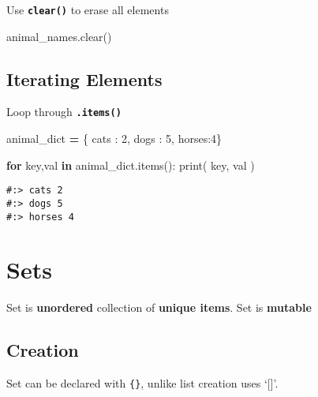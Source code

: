 \documentclass[
]{book}
\newenvironment{Shaded}{\begin{snugshade}}{\end{snugshade}}
\newcommand{\BuiltInTok}[1]{#1}
\newcommand{\ControlFlowTok}[1]{\textcolor[rgb]{0.27,0.27,0.27}{\textbf{#1}}}
\newcommand{\DecValTok}[1]{\textcolor[rgb]{0.06,0.06,0.06}{#1}}
\newcommand{\KeywordTok}[1]{\textcolor[rgb]{0.27,0.27,0.27}{\textbf{#1}}}
\newcommand{\NormalTok}[1]{#1}
\newcommand{\OperatorTok}[1]{\textcolor[rgb]{0.43,0.43,0.43}{\textbf{#1}}}
\newcommand{\StringTok}[1]{\textcolor[rgb]{0.5,0.5,0.5}{#1}}
\begin{document}
Use \textbf{\texttt{clear()}} to erase all elements

\begin{Shaded}
\begin{Highlighting}[]
\NormalTok{animal\_names.clear()}
\end{Highlighting}
\end{Shaded}

\hypertarget{iterating-elements}{%
\subsection{Iterating Elements}\label{iterating-elements}}

Loop through \textbf{\texttt{.items()}}

\begin{Shaded}
\begin{Highlighting}[]
\NormalTok{animal\_dict }\OperatorTok{=}\NormalTok{ \{ }\StringTok{\textquotesingle{}cats\textquotesingle{}}\NormalTok{ : }\DecValTok{2}\NormalTok{, }\StringTok{\textquotesingle{}dogs\textquotesingle{}}\NormalTok{ : }\DecValTok{5}\NormalTok{, }\StringTok{\textquotesingle{}horses\textquotesingle{}}\NormalTok{:}\DecValTok{4}\NormalTok{\}}

\ControlFlowTok{for}\NormalTok{ key,val }\KeywordTok{in}\NormalTok{ animal\_dict.items():}
  \BuiltInTok{print}\NormalTok{( key, val )}
\end{Highlighting}
\end{Shaded}

\begin{verbatim}
#:> cats 2
#:> dogs 5
#:> horses 4
\end{verbatim}

\hypertarget{sets}{%
\section{Sets}\label{sets}}

Set is \textbf{unordered} collection of \textbf{unique items}. Set is \textbf{mutable}

\hypertarget{creation}{%
\subsection{Creation}\label{creation}}

Set can be declared with \texttt{\{\}}, unlike list creation uses `{[}{]}'.
\end{document}
